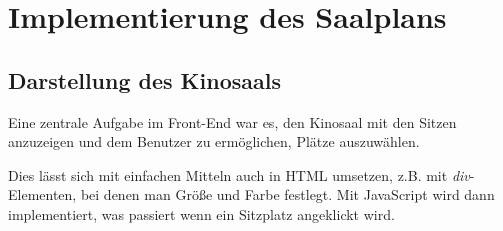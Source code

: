 \section{Implementierung des Saalplans}

\subsection{Darstellung des Kinosaals}

Eine zentrale Aufgabe im Front-End war es, den Kinosaal mit den Sitzen anzuzeigen und dem Benutzer zu ermöglichen, Plätze auszuwählen.

Dies lässt sich mit einfachen Mitteln auch in \acs{HTML} umsetzen, z.B. mit \textit{div}-Elementen, bei denen man Größe und Farbe festlegt.
Mit JavaScript wird dann implementiert, was passiert wenn ein Sitzplatz angeklickt wird.

